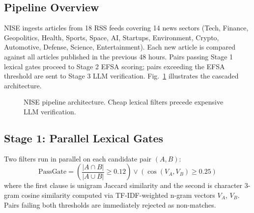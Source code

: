\documentclass[conference]{IEEEtran}
\begin{document}
\subsection{Pipeline Overview}
NISE ingests articles from 18 RSS feeds covering 14 news sectors (Tech, Finance, Geopolitics, Health, Sports, Space, AI, Startups, Environment, Crypto, Automotive, Defense, Science, Entertainment).
Each new article is compared against all articles published in the previous 48 hours.
Pairs passing Stage 1 lexical gates proceed to Stage 2 EFSA scoring; pairs exceeding the EFSA threshold are sent to Stage 3 LLM verification.
Fig.~\ref{fig:architecture} illustrates the cascaded architecture.

\begin{figure}[!t]
    \centering
    \caption{NISE pipeline architecture. Cheap lexical filters precede expensive LLM verification.}
    \label{fig:architecture}
\end{figure}

\subsection{Stage 1: Parallel Lexical Gates}
Two filters run in parallel on each candidate pair $(A, B)$:
\begin{equation}
\text{PassGate} = \left(\frac{|A \cap B|}{|A \cup B|} \ge 0.12\right) \lor \left(\cos(V_A, V_B) \ge 0.25\right)
\end{equation}
where the first clause is unigram Jaccard similarity and the second is character 3-gram cosine similarity computed via TF-IDF-weighted n-gram vectors $V_A$, $V_B$.
Pairs failing both thresholds are immediately rejected as non-matches.
\end{document}
